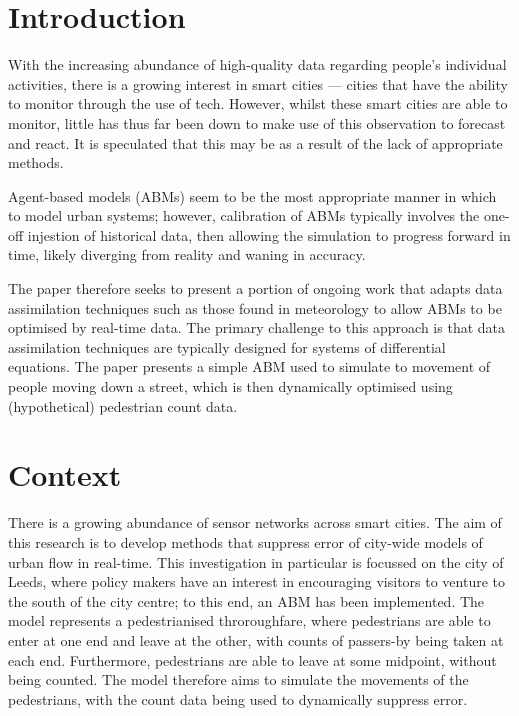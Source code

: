 \section{Introduction}
\label{malleson:intro}

With the increasing abundance of high-quality data regarding people's individual activities, there is a growing interest in smart cities --- cities that have the ability to monitor through the use of tech.
However, whilst these smart cities are able to monitor, little has thus far been down to make use of this observation to forecast and react.
It is speculated that this may be as a result of the lack of appropriate methods.

Agent-based models (ABMs) seem to be the most appropriate manner in which to model urban systems; however, calibration of ABMs typically involves the one-off injestion of historical data, then allowing the simulation to progress forward in time, likely diverging from reality and waning in accuracy.

The paper therefore seeks to present a portion of ongoing work that adapts data assimilation techniques such as those found in meteorology to allow ABMs to be optimised by real-time data.
The primary challenge to this approach is that data assimilation techniques are typically designed for systems of differential equations.
The paper presents a simple ABM used to simulate to movement of people moving down a street, which is then dynamically optimised using (hypothetical) pedestrian count data.

\section{Context}
\label{malleson:context}

There is a growing abundance of sensor networks across smart cities.
The aim of this research is to develop methods that suppress error of city-wide models of urban flow in real-time.
This investigation in particular is focussed on the city of Leeds, where policy makers have an interest in encouraging visitors to venture to the south of the city centre; to this end, an ABM has been implemented.
The model represents a pedestrianised throroughfare, where pedestrians are able to enter at one end and leave at the other, with counts of passers-by being taken at each end.
Furthermore, pedestrians are able to leave at some midpoint, without being counted.
The model therefore aims to simulate the movements of the pedestrians, with the count data being used to dynamically suppress error.  

